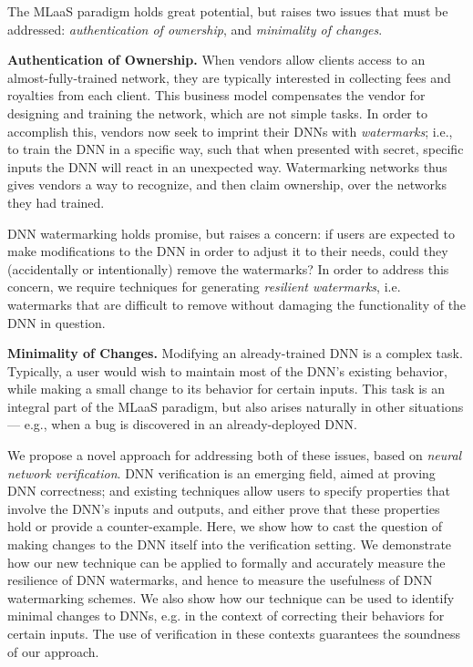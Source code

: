 \documentclass{easychair}
\begin{document}
The MLaaS paradigm holds great potential, but raises two issues that
must be addressed: \emph{authentication of ownership}, and
\emph{minimality of changes}.

\medskip\noindent
\textbf{Authentication of Ownership.}
When vendors allow clients access to an almost-fully-trained network,
they are typically interested in collecting fees and royalties from
each client. This business model compensates the vendor for designing
and training the network, which are not simple tasks. In order to
accomplish this, vendors now seek to imprint their DNNs with
\emph{watermarks}; i.e., to train the DNN in a specific way, such that
when presented with secret, specific inputs the DNN will react in an
unexpected way. Watermarking networks thus gives vendors a way to
recognize, and then claim ownership, over the networks they had
trained.

DNN watermarking holds promise, but raises a concern: if users are
expected to make modifications to the DNN in order to adjust it to
their needs, could they (accidentally or intentionally) remove the
watermarks? In order to address this concern, we require techniques
for generating \emph{resilient watermarks}, i.e. watermarks that are
difficult to remove without damaging the functionality of the DNN in
question.

\medskip\noindent \textbf{Minimality of Changes.}
Modifying an already-trained DNN is a complex task. Typically, a user
would wish to maintain most of the DNN's existing behavior, while
making a small change to its behavior for certain inputs. This task is
an integral part of the MLaaS paradigm, but also arises naturally in
other situations --- e.g., when a bug is discovered in an
already-deployed DNN.

We propose a novel approach for addressing both of these issues, based
on \emph{neural network verification}. DNN verification is an emerging
field, aimed at proving DNN correctness; and existing techniques allow
users to specify properties that involve the DNN's inputs and outputs,
and either prove that these properties hold or provide a
counter-example. Here, we show how to cast the question of making
changes to the DNN itself into the verification setting. We
demonstrate how our new technique can be applied to formally and
accurately measure the resilience of DNN watermarks, and hence to
measure the usefulness of DNN watermarking schemes. We also show how
our technique can be used to identify minimal changes to DNNs, e.g. in
the context of correcting their behaviors for certain inputs. The use
of verification in these contexts guarantees the soundness of our
approach.
\end{document}
